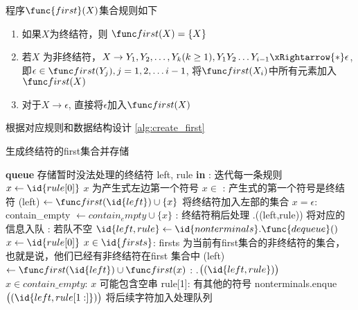 \documentclass[../report]{subfiles}
\begin{document}
程序$\func{first}(X)$集合规则如下

\begin{enumerate}
  \item 如果$X$为终结符，则 $\first (X) = \{ X \}$
  \item 若$X$ 为非终结符，$X \to Y_1, Y_2, \dots, Y_k (k \ge 1), Y_1 Y_2 \dots Y_{i-1} \xRightarrow{*}\epsilon$,即$\epsilon \in \first(Y_j), j=1,2,\dots i-1$, 将$\first (X_i)$中所有元素加入$\first (X)$
  \item 对于$X \to \epsilon$, 直接将$\epsilon$加入$\first (X) $
\end{enumerate}

根据对应规则和数据结构设计
\cref{alg:create_first}

\begin{algorithm}[H]
  \caption{生成终结符的first集合并存储}
  \begin{codebox}
      \li \textbf{queue}  \Comment[8] 存储暂时没法处理的终结符
      \li \For left, rule \textbf{in} :
        \Comment[7.5] 迭代每一条规则
      \Then
        \li $x \gets \id{rule[0]}$ \Comment $x$ 为产生式左边第一个符号
        \li \If $ x \in$ :
          \Comment[5.7] 产生式的第一个符号是终结符
        \Then
          \li \first(left) $\gets \first (\id{left}) \cup \{ x \}$ \Comment 将终结符加入左部的\first 集合
        \li \Else \If $ x = \epsilon$:
          \li contain\_empty $\gets contain_empty \cup \{ x \}$
        \li \Else: \Comment[2] 终结符稍后处理
          \li
              .((left,rule))
                \Comment[2] 将对应的信息入队
        \End
      \End
      \li \While {}: \Comment 若队不空
      \Then
        \li $\id{left,rule} \gets \id{nonterminals}.\func{dequeue}()$
        \li $x \gets \id{rule[0]}$
        \li \If $x \in \id{firsts}$: \Comment firsts 为当前有first集合的非终结符的集合，
        \Then
          \zi \Comment[5.5] 也就是说，他们已经有非终结符在first 集合中
          \li \first (left) $\gets \first (\id{left}) \cup \first (x)$
        \li \Else :
          \li
              .$\big((\id{left,rule})\big)$
        \End
        \li \If $x \in contain\_empty$: \Comment $x$ 可能包含空串
        \Then
          \li \If rule[1]: \Comment 有其他的符号
          \Then
            \li nonterminals.enque$\big((\id{left, rule[1:]})\big)$ \Comment 将后续字符加入处理队列
          \End
        \End
      \End
  \end{codebox}
  \label{alg:create_first}
\end{algorithm}
\end{document}
